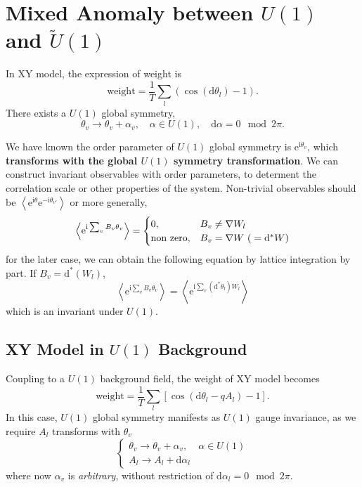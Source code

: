 
\section{Mixed Anomaly between $U(1)$ and $\tilde{U}(1)$}
In XY model, the expression of weight is
\begin{equation}
  \text{weight} = \frac{1}{T} \sum_{l} \left( \cos (\mathrm{d} \theta_{l}) -1\right).
\end{equation}
There exists a $U(1)$ global symmetry,
\begin{equation}
  \theta_{v} \to \theta_{v} + \alpha_{v},\quad \alpha \in U(1), \quad \mathrm{d} \alpha = 0 \mod 2\pi.
\end{equation}

We have known the order parameter of $U(1)$ global symmetry is $\mathrm{e}^{\mathrm{i}\theta_{v}}$, which \textbf{transforms with the global $U(1)$ symmetry transformation}.
We can construct invariant observables with order parameters, to determent the correlation scale or other properties of the system. Non-trivial observables should be $\left< \mathrm{e}^{\mathrm{i} \theta} \mathrm{e}^{- \mathrm{i}\theta_{v'}} \right>$ or more generally, 
\begin{equation}
  \left< \mathrm{e}^{ \mathrm{i} \sum_{v} B_v \theta _{v}} \right> =
  \begin{cases}
    0, & B_v \neq \nabla W_l \\
    $non zero$, & B_v = \nabla W \ ({}= \mathrm{d} ^{*} W)
  \end{cases}
\end{equation}
for the later case, we can obtain the following equation by lattice integration by part. If $B_v = \mathrm{d} ^{*} \left( W_l \right)$,
\begin{equation}
  \left< \mathrm{e}^{\mathrm{i}\sum_{v} B_v \theta_{v}} \right> = \left< \mathrm{e}^{\mathrm{i}\sum_{v} \left( \mathrm{d}^{*} \theta_{l} \right)W_l} \right>
\end{equation}
which is an invariant under $U(1)$.

\subsection{XY Model in $U(1)$ Background}
Coupling to a $U(1)$ background field, the weight of XY model becomes
\begin{equation}
  \text{weight} = \frac{1}{T} \sum_{l}  \left[ \cos \left( \mathrm{d} \theta_{l} - q A_l \right) -1 \right].
\end{equation}
In this case, $U(1)$ global symmetry manifests as $U(1)$ gauge invariance, as we require $A_l$ transforms with $\theta_{v}$
\begin{equation}
  \begin{cases}
    \theta_{v} \to \theta_{v} + \alpha _{v}, & \alpha \in  U(1) \\
    A_l \to A_l + \mathrm{d} \alpha _{l}
  \end{cases}
\end{equation}
where now $\alpha _{v}$ is \emph{arbitrary}, without restriction of $\mathrm{d} \alpha _{l} = 0 \mod 2 \pi $.

